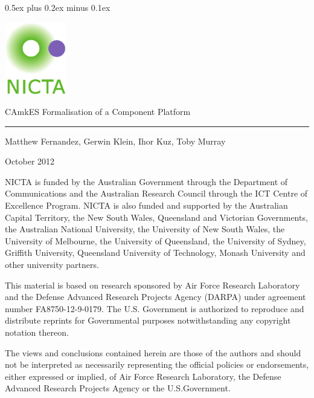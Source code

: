 \documentclass[11pt,a4paper]{scrreprt}
\date{\small\today}
\date{}
\newcommand{\titl}{CAmkES Formalisation of a Component Platform}
\newcommand{\authors}{Matthew Fernandez, Gerwin Klein, Ihor Kuz, Toby Murray}
\newcommand{\nictafundingacknowledgement}{%
NICTA is funded by the Australian Government through the Department of Communications and the Australian Research Council through the ICT Centre of Excellence Program. NICTA is also funded and supported by the Australian Capital Territory, the New South Wales, Queensland and Victorian Governments, the Australian National University, the University of New South Wales, the University of Melbourne, the University of Queensland, the University of Sydney, Griffith University, Queensland University of Technology, Monash University and other university partners.}
\newcommand{\trdisclaimer}{%
This material is based on research sponsored by Air Force Research Laboratory
and the Defense Advanced Research Projects Agency (DARPA) under agreement number
FA8750-12-9-0179. The U.S. Government is authorized to reproduce and distribute
reprints for Governmental purposes notwithstanding any copyright notation
thereon.

The views and conclusions contained herein are those of the authors and should
not be interpreted as necessarily representing the official policies or
endorsements, either expressed or implied, of Air Force Research Laboratory,
the Defense Advanced Research Projects Agency or the U.S.Government.}
\newcommand{\bigdisclaimer}{%
\nictafundingacknowledgement

\vspace{2ex}
\trdisclaimer}
\begin{document}
\parindent 0pt\parskip 0.5ex plus 0.2ex minus 0.1ex


\begin{center}
 \includegraphics[width=0.2\textwidth]{imgs/NICTA_logo}
\end{center}
	
\vspace{14ex}
\textsf{\huge \titl}


\vspace{4ex}
\rule{0.85\textwidth}{5pt}
\vspace{4ex}
  
{\large \authors 

\vspace{2ex}
October 2012}

\vfill
{\small
\bigdisclaimer
}

\thispagestyle{empty}
\newpage

\tableofcontents





\renewcommand{\refname}{}
\nocite{*}

\end{document}
